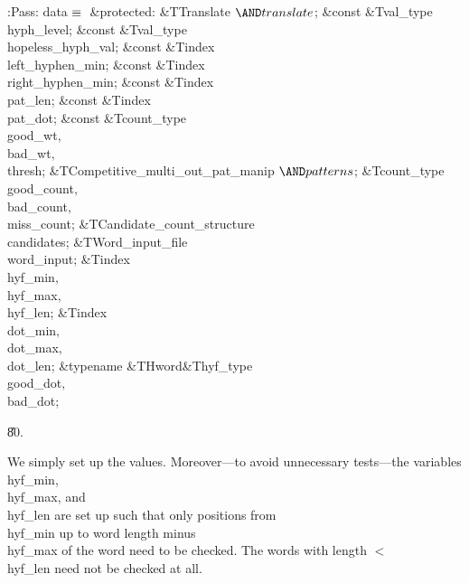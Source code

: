 \Y\B\4:Pass: data\X${}\equiv{}$\6
\4\&{protected}:\6
\&{TTranslate} ${}{\AND}\\{translate}{}$;\6
\&{const} \&{Tval\_type} \\{hyph\_level};\6
\&{const} \&{Tval\_type} \\{hopeless\_hyph\_val};\6
\&{const} \&{Tindex} \\{left\_hyphen\_min};\6
\&{const} \&{Tindex} \\{right\_hyphen\_min};\6
\&{const} \&{Tindex} \\{pat\_len};\6
\&{const} \&{Tindex} \\{pat\_dot};\6
\&{const} \&{Tcount\_type} \\{good\_wt}${},{}$ \\{bad\_wt}${},{}$ \\{thresh};%
\6
\&{TCompetitive\_multi\_out\_pat\_manip} ${}{\AND}\\{patterns}{}$;\7
\&{Tcount\_type} \\{good\_count}${},{}$ \\{bad\_count}${},{}$ \\{miss\_count};%
\6
\&{TCandidate\_count\_structure} \\{candidates};\7
\&{TWord\_input\_file} \\{word\_input};\7
\&{Tindex} \\{hyf\_min}${},{}$ \\{hyf\_max}${},{}$ \\{hyf\_len};\6
\&{Tindex} \\{dot\_min}${},{}$ \\{dot\_max}${},{}$ \\{dot\_len};\6
\&{typename} \&{THword}\DC\&{Thyf\_type} \\{good\_dot}${},{}$ \\{bad\_dot};%
\par
\U80.\fi

We simply set up the values. Moreover---to avoid unnecessary
tests---the variables \\{hyf\_min}, \\{hyf\_max}, and \\{hyf\_len} are set up
such that only positions from \\{hyf\_min} up to word length minus
\\{hyf\_max} of the word need to be checked. The words with length
$<$\\{hyf\_len} need not be checked at all.

